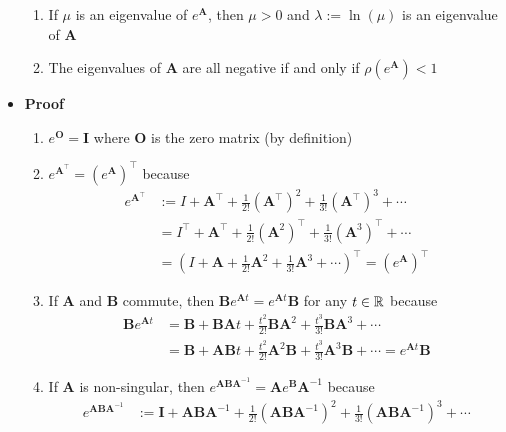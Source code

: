 \documentclass[12pt,a4paper]{article}
\begin{document}
\begin{itemize}
\begin{enumerate}
    \item If $\mu$ is an eigenvalue of $e^{\bm{A}}$,
      then $\mu>0$ and $\lambda:=\ln(\mu)$ is an eigenvalue of $\bm{A}$

    \item The eigenvalues of $\bm{A}$ are all negative if and only if $\rho(e^{\bm{A}})< 1$

    \end{enumerate}

    \clearpage

\item \textbf{Proof}
  \begin{enumerate}
    \item $e^{\bm{O}} = \bm{I}$ where $\bm{O}$ is the zero matrix (by definition)
    \item $e^{\bm{A}^{\top}} = \left(e^{\bm{A}}\right)^{\top}$ because
      \begin{align}
        e^{\bm{A}^{\top}}
        & := I + \bm{A}^{\top} + \frac{1}{2!}(\bm{A}^{\top})^{2} + \frac{1}{3!}(\bm{A}^{\top})^{3} + \cdots  \nonumber \\
        & = I^{\top} + \bm{A}^{\top} + \frac{1}{2!}(\bm{A}^{2})^{\top} + \frac{1}{3!}(\bm{A}^{3})^{\top} + \cdots \nonumber \\
        & = \left(I + \bm{A} + \frac{1}{2!}\bm{A}^{2} + \frac{1}{3!}\bm{A}^{3} + \cdots\right)^{\top} = (e^{\bm{A}})^{\top}
          \nonumber%
      \end{align}
    \item If $\bm{A}$ and $\bm{B}$ commute,
      then $\bm{B}e^{\bm{A}t} = e^{\bm{A}t}\bm{B}$ for any $t\in\mathbb{R}$ because
      \begin{align}
       \bm{B}e^{\bm{A}t} 
       & = \bm{B} + \bm{B}\bm{A}t + \frac{t^{2}}{2!}\bm{B}\bm{A}^{2} + \frac{t^{3}}{3!}\bm{B}\bm{A}^{3} + \cdots \nonumber \\
       & = \bm{B} + \bm{A}\bm{B}t + \frac{t^{2}}{2!}\bm{A}^{2}\bm{B} + \frac{t^{3}}{3!}\bm{A}^{3}\bm{B} + \cdots = e^{\bm{A}t}\bm{B}
         \nonumber%
      \end{align}
    \item If $\bm{A}$ is non-singular, then $e^{\bm{A}\bm{B}\bm{A}^{-1}} = \bm{A}e^{\bm{B}}\bm{A}^{-1}$
      because
      \begin{align}
        e^{\bm{A}\bm{B}\bm{A}^{-1}}
        & := \bm{I} + \bm{A}\bm{B}\bm{A}^{-1} + \frac{1}{2!}(\bm{A}\bm{B}\bm{A}^{-1})^{2} + \frac{1}{3!}(\bm{A}\bm{B}\bm{A}^{-1})^{3} + \cdots  \nonumber \\

\end{align}
\end{enumerate}
\end{itemize}
\end{document}
